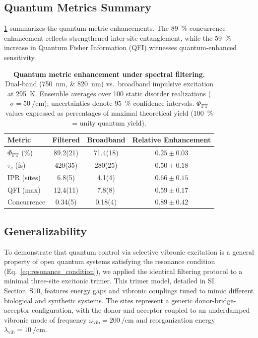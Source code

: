 \documentclass[journal=jpcl,manuscript=letter]{achemso}
\begin{document}
\subsection*{Quantum Metrics Summary}

\cref{tab:quantum_metrics} summarizes the quantum metric enhancements. The \SI{89}{\percent} concurrence enhancement reflects strengthened inter-site entanglement, while the \SI{59}{\percent} increase in Quantum Fisher Information (QFI) witnesses quantum-enhanced sensitivity.

\begin{table}[t]
\centering
\caption{\textbf{Quantum metric enhancement under spectral filtering.} Dual-band (\SIlist{750;820}{\nano\meter}) vs.\ broadband impulsive excitation at \SI{295}{\kelvin}. Ensemble averages over \num{100} static disorder realizations ($\sigma = \SI{50}{\per\centi\meter}$); uncertainties denote \SI{95}{\percent} confidence intervals. $\Phi_{\mathrm{FT}}$ values expressed as percentages of maximal theoretical yield (\SI{100}{\percent} = unity quantum yield).}
\label{tab:quantum_metrics}
\begin{tabular}{lccc}
\toprule
\textbf{Metric} & \textbf{Filtered} & \textbf{Broadband} & \textbf{Relative Enhancement} \\
\midrule
$\Phi_{\mathrm{FT}}$ (\si{\percent}) & 89.2(21) & 71.4(18) & $0.25 \pm 0.03$ \\
$\tau_c$ (\si{\femto\second}) & 420(35) & 280(25) & $0.50 \pm 0.18$ \\
IPR (sites) & 6.8(5) & 4.1(4) & $0.66 \pm 0.15$ \\
QFI (max) & 12.4(11) & 7.8(8) & $0.59 \pm 0.17$ \\
Concurrence & 0.34(5) & 0.18(4) & $0.89 \pm 0.42$ \\
\bottomrule
\end{tabular}
\end{table}

\subsection*{Generalizability}

To demonstrate that quantum control via selective vibronic excitation is a general property of open quantum systems satisfying the resonance condition (Eq.~\cref{eq:resonance_condition}), we applied the identical filtering protocol to a minimal three-site excitonic trimer. This trimer model, detailed in SI Section~S10, features energy gaps and vibronic couplings tuned to mimic different biological and synthetic systems. The sites represent a generic donor-bridge-acceptor configuration, with the donor and acceptor coupled to an underdamped vibronic mode of frequency $\omega_{\mathrm{vib}} = \SI{200}{\per\centi\meter}$ and reorganization energy $\lambda_{\mathrm{vib}} = \SI{10}{\per\centi\meter}$.
\end{document}
